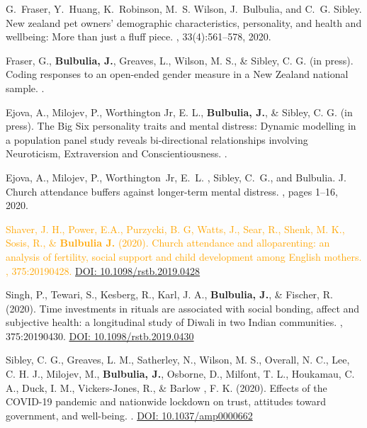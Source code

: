 \documentclass{article}
\begin{document}
\begin{thebibliography}{99}
G.~Fraser, Y.~Huang, K.~Robinson, M.~S. Wilson, J.~Bulbulia, and C.~G. Sibley.
\newblock New zealand pet owners' demographic characteristics, personality, and
  health and wellbeing: More than just a fluff piece.
, 33(4):561--578, 2020.


 Fraser, G., {\bf Bulbulia, J.}, Greaves, L., Wilson, M. S., \& Sibley, C. G. (in press). 
\newblock Coding responses to an open-ended gender measure in a New Zealand national sample.
. 


 Ejova, A., Milojev, P., Worthington Jr, E. L., {\bf Bulbulia, J.}, \& Sibley, C. G. (in press). 
\newblock The Big Six personality traits and mental distress: Dynamic modelling in a population panel study reveals bi-directional relationships involving Neuroticism, Extraversion and Conscientiousness.
. 

 Ejova, A., Milojev, P., Worthington~Jr, E.~L. , Sibley, C.~G., and {\bf }Bulbulia. J.
\newblock Church attendance buffers against longer-term mental distress.
, pages 1--16, 2020.


 \textcolor{Orange}{Shaver, J. H., Power, E.A., Purzycki, B. G, Watts, J., Sear, R., Shenk, M. K., Sosis, R., \& {\bf Bulbulia J.} (2020). 
\newblock Church attendance and alloparenting: an analysis of fertility, social support and child development among English mothers. 
, 375:20190428.
\href{http://dx.doi.org/10.1098/rstb.2019.0428}{DOI: 10.1098/rstb.2019.0428}}


 Singh, P., Tewari, S., Kesberg, R., Karl, J. A., {\bf Bulbulia, J.}, \& Fischer, R. (2020). 
\newblock Time investments in rituals are associated with social bonding, affect and subjective health: a longitudinal study of Diwali in two Indian communities. 
, 375:20190430.
\href{http://dx.doi.org/10.1098/rstb.2019.0430}{DOI: 10.1098/rstb.2019.0430}


 Sibley, C. G., Greaves, L. M., Satherley, N., Wilson, M. S., Overall, N. C., Lee, C. H. J., Milojev, M., {\bf Bulbulia, J.}, Osborne, D., Milfont, T. L., Houkamau, C. A., Duck, I. M., Vickers-Jones, R., \& Barlow , F. K. (2020).
\newblock Effects of the COVID-19 pandemic and nationwide lockdown on trust, attitudes toward government, and well-being. 
.
\href{http://dx.doi.org/10.1037/amp0000662}{DOI: 10.1037/amp0000662}



\end{thebibliography}
\end{document}

